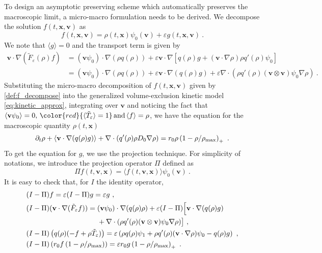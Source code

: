 \documentclass[review,onefignum,onetabnum]{siamart220329}
\newcommand {\bv} { {\mathbf{v}} }
\newcommand {\bx} { {\mathbf{x}} }
\newcommand {\p}   {\partial}
\begin{document}
To design an asymptotic preserving scheme which automatically preserves the macroscopic limit, a micro-macro formulation needs to be derived. 
We decompose the solution $f(t,\bx,\bv)$ as 
\begin{equation}\label{def:f_decompose}
    f(t,\bx,\bv) = \rho(t,\bx) \psi_0(\bv) + \varepsilon g(t,\bx,\bv)\ .
\end{equation}
We note that $\langle g\rangle = 0$ and the transport term is given by
\begin{align*}
    \bv \cdot \nabla(\tilde{F}_\varepsilon(\rho)f) & = (\bv\psi_0) \cdot \nabla(\rho q(\rho)) + \varepsilon \bv \cdot \nabla \left[q(\rho)g + (\bv\cdot\nabla\rho)\rho q'(\rho)\psi_0\right]\\
    & = (\bv\psi_0) \cdot \nabla(\rho q(\rho)) + \varepsilon \bv \cdot \nabla (q(\rho)g) + \varepsilon \nabla \cdot (\rho q'(\rho) (\bv\otimes\bv)\psi_0\nabla\rho)\ .
\end{align*}
Substituting the micro-macro decomposition of $f(t, \bx, \bv)$ given by \cref{def:f_decompose} into the generalized volume-exclusion kinetic model \cref{eq:kinetic_approx}, integrating over $\bv$ and noticing the fact that $\langle\bv\psi_0\rangle = 0, \, {\color{red}{\langle \tilde{T}_\varepsilon \rangle=1}} \, \textnormal{and}\, \langle f\rangle = \rho$, we have the equation for the macroscopic quantity $\rho(t, \bx)$
\begin{equation*}
    \p_t \rho +  \langle\bv\cdot \nabla (q(\rho) g)\rangle + \nabla \cdot (q'(\rho)\rho D_0\nabla\rho) =  r_0 \rho\left(1 - \rho/\rho_{\rm max}\right)_+\ .
\end{equation*}
To get the equation for $g$, we use the projection technique. 
For simplicity of notations, we introduce the projection operator $\Pi$ defined as 
\begin{equation*}
    \Pi f(t,\mathbf{v},\mathbf{x}) = \langle f(t,\mathbf{v},\mathbf{x})\rangle \psi_0(\mathbf{v})\ .
\end{equation*}
It is easy to check that, {for $I$ the identity operator,} 
\begin{align*}
    & (I - \Pi) f = \varepsilon(I - \Pi) g = \varepsilon g\ ,\\
    & (I-\Pi) (\bv \cdot \nabla (\tilde{F}_\varepsilon f))= (\bv\psi_0) \cdot \nabla(q(\rho)\rho) + \varepsilon(I-\Pi)\Bigl[\bv \cdot \nabla (q(\rho)g)\\ &\qquad\qquad\qquad\qquad\qquad + \nabla \cdot (\rho q'(\rho)(\bv\otimes\bv)\psi_0\nabla\rho)\bigr]\ ,\\
    & (I - \Pi) \left(q(\rho)(-f + \rho \tilde{T}_\varepsilon)\right) = \varepsilon\left(\rho q(\rho)\psi_1 + \rho q'(\rho)(\bv\cdot\nabla\rho)\psi_0 - q(\rho) g\right)\ ,\\
    & (I- \Pi) \left(r_0 f \left(1 - \rho/\rho_{\rm max}\right)\right) = \varepsilon r_0 {g} \left(1 - \rho/\rho_{\rm max}\right)_+ \ .
\end{align*}
\end{document}

